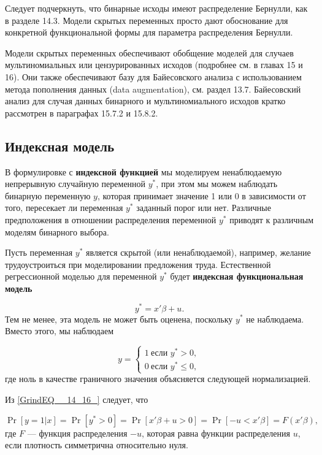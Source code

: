 Следует подчеркнуть,  что бинарные исходы имеют распределение Бернулли,  как  в разделе 14.3. Модели скрытых переменных просто дают обоснование для конкретной функциональной формы для параметра распределения Бернулли.

Модели скрытых переменных  обеспечивают обобщение моделей для случаев мультиномиальных или цензурированных исходов (подробнее см. в главах 15 и 16). Они также обеспечивают базу для Байесовского анализа с использованием метода пополнения данных (data augmentation), см. раздел 13.7. Байесовский анализ для случая данных бинарного и мультиномиального исходов кратко рассмотрен в параграфах 15.7.2 и 15.8.2.

\subsection{Индексная модель}

В формулировке с \textbf{индексной функцией} мы моделируем ненаблюдаемую непрерывную случайную переменной $y^*$,  при этом мы можем наблюдать бинарную переменную $y$,  которая принимает значение 1 или 0 в зависимости от того,  пересекает ли переменная $y^*$ заданный порог или нет. Различные предположения в отношении распределения переменной $y^*$ приводят к различным моделям бинарного выбора.

Пусть переменная $y^*$ является скрытой (или ненаблюдаемой),  например,  желание трудоустроиться при моделировании предложения труда. Естественной регрессионной моделью для переменной $y^*$ будет \textbf{индексная функциональная модель} 

\begin{equation} 
\label{GrindEQ__14_15_} y^*=x'\beta + u. 
\end{equation} 
Тем не менее,  эта модель не может быть оценена,  поскольку $y^*$ не наблюдаема. Вместо этого,  мы наблюдаем 

\begin{equation} 
\label{GrindEQ__14_16_} 
y = \begin{cases}
1  \ \text{если } y^*>0,  \\ 
0  \ \text{если } y^*\le 0,  
\end{cases} 
\end{equation}
где ноль в качестве граничного значения объясняется следующей нормализацией.

Из \eqref{GrindEQ__14_16_} следует, что

\begin{equation} 
\label{GrindEQ__14_17_} 
\Pr[y=1|x] = \Pr[y^* > 0] = \Pr[x'\beta + u > 0] = \Pr[-u < x'\beta] = F(x'\beta),  
\end{equation} 
где $F$ --- функция распределения $-u$,  которая равна функции распределения $u$, если плотность симметрична относительно нуля.

